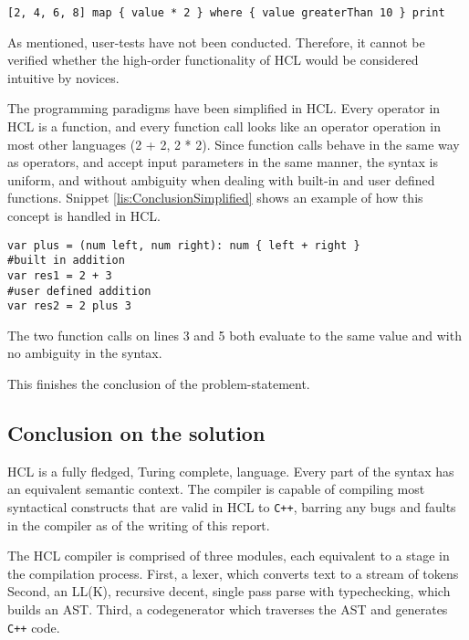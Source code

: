 \begin{lstlisting}[language=hcl,label=lis:ConclusionMapFilter,caption=High-order functionality in HCL]
[2, 4, 6, 8] map { value * 2 } where { value greaterThan 10 } print
\end{lstlisting}

As mentioned, user-tests have not been conducted.
Therefore, it cannot be verified whether the high-order functionality of HCL would be considered intuitive by novices.

The programming paradigms have been simplified in HCL.
Every operator in HCL is a function, and every function call looks like an operator operation in most other languages (2 + 2, 2 * 2).
Since function calls behave in the same way as operators, and accept input parameters in the same manner, the syntax is uniform, and without ambiguity when dealing with built-in and user defined functions.
Snippet \ref{lis:ConclusionSimplified} shows an example of how this concept is handled in HCL.

\begin{lstlisting}[language=hcl,label=lis:ConclusionSimplified,caption=Built-in and user defined function]
var plus = (num left, num right): num { left + right }
#built in addition
var res1 = 2 + 3
#user defined addition
var res2 = 2 plus 3 
\end{lstlisting}

The two function calls on lines 3 and 5 both evaluate to the same value and with no ambiguity in the syntax.

This finishes the conclusion of the problem-statement.

\subsection{Conclusion on the solution} %
HCL is a fully fledged, Turing complete, language.
Every part of the syntax has an equivalent semantic context. 
The compiler is capable of compiling most syntactical constructs that are valid in HCL to \texttt{C++}, barring any bugs and faults in the compiler as of the writing of this report.

The HCL compiler is comprised of three modules, each equivalent to a stage in the compilation process.
First, a lexer, which converts text to a stream of tokens
Second, an LL(K), recursive decent, single pass parse with typechecking, which builds an AST.
Third, a codegenerator which traverses the AST and generates \texttt{C++} code.

